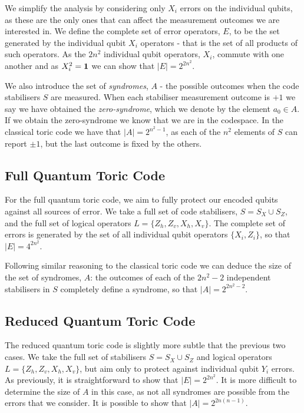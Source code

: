 We simplify the analysis by considering only $X_i$ errors on the individual qubits, as these are the only ones that can affect the measurement outcomes we are interested in. We define the complete set of error operators, $E$, to be the set generated by the individual qubit $X_i$ operators - that is the set of all products of such operators. As the $2n^2$ individual qubit operators, $X_i$, commute with one another and as $X_i^2 = \mathbf{1}$ we can show that $|E| = 2^{2n^2}$.

We also introduce the set of \textit{syndromes}, $A$ - the possible outcomes when the code stabilisers $S$ are measured. When each stabiliser measurement outcome is $+1$ we say we have obtained the \textit{zero-syndrome}, which we denote by the element $a_0 \in A$. If we obtain the zero-syndrome we know that we are in the codespace. In the classical toric code we have that $|A| = 2^{n^2-1}$, as each of the $n^2$ elements of $S$ can report $\pm 1$, but the last outcome is fixed by the others.

\subsection{Full Quantum Toric Code}

For the full quantum toric code, we aim to fully protect our encoded qubits against all sources of error. We take a full set of code stabilisers, $S = S_X \cup S_Z$, and the full set of logical operators $L = \{Z_h, Z_v, X_h, X_v\}$. The complete set of errors is generated by the set of all individual qubit operators $\{X_i, Z_i\}$, so that $|E| = 4^{2n^2}$.

Following similar reasoning to the classical toric code we can deduce the size of the set of syndromes, $A$: the outcomes of each of the $2n^2 - 2$ independent stabilisers in $S$ completely define a syndrome, so that $|A| = 2^{2n^2-2}$.

\subsection{Reduced Quantum Toric Code}

The reduced quantum toric code is slightly more subtle that the previous two cases. We take the full set of stabilisers $S = S_X \cup S_Z$ and logical operators $L = \{Z_h, Z_v, X_h, X_v\}$, but aim only to protect against individual qubit $Y_i$ errors. As previously, it is straightforward to show that $|E| = 2^{2n^2}$. It is more difficult to determine the size of $A$ in this case, as not all syndromes are possible from the errors that we consider. It is possible to show that $|A| = 2^{2n(n-1)}$.

